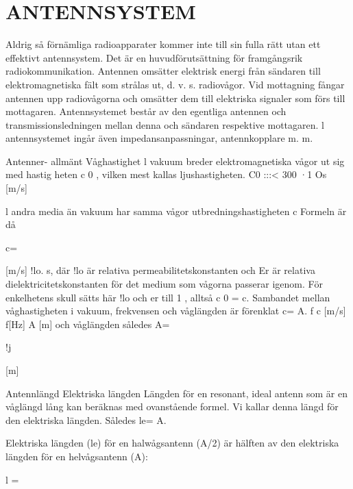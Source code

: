 \chapter{ANTENNSYSTEM}

Aldrig så förnämliga radioapparater kommer inte till sin fulla rätt utan ett effektivt
antennsystem. Det är en huvudförutsättning för framgångsrik radiokommunikation.
Antennen omsätter elektrisk energi från
sändaren till elektromagnetiska fält som strålas ut, d. v. s. radiovågor.
Vid mottagning fångar antennen upp
radiovågorna och omsätter dem till elektriska signaler som förs till mottagaren.
Antennsystemet består av den egentliga
antennen och transmissionsledningen mellan denna och sändaren respektive mottagaren. l antennsystemet ingår även impedansanpassningar, antennkopplare m. m.

Antenner- allmänt
Våghastighet
l vakuum breder elektromagnetiska vågor
ut sig med hastig heten c 0 , vilken mest kallas
ljushastigheten.
C0 :::< 300 ·1 Os [m/s]

l andra media än vakuum har samma
vågor utbredningshastigheten c
Formeln är då

c=~

[m/s]
!lo. s,
där !lo är relativa permeabilitetskonstanten
och Er är relativa dielektricitetskonstanten för
det medium som vågorna passerar igenom.
För enkelhetens skull sätts här !lo och er till
1 , alltså c 0 = c.
Sambandet mellan våghastigheten i vakuum, frekvensen och våglängden är förenklat
c= A. f
c [m/s] f[Hz] A [m]
och våglängden således A=

!j

[m]

Antennlängd
Elektriska längden
Längden för en resonant, ideal antenn som
är en våglängd lång kan beräknas med
ovanstående formel. Vi kallar denna längd
för den elektriska längden. Således le= A.

Elektriska längden (le) för en halwågsantenn (A/2) är hälften av den elektriska
längden för en helvågsantenn (A):

l =~

